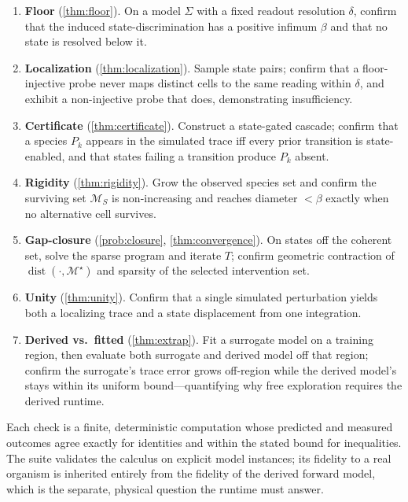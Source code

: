 \documentclass[11pt,a4paper]{article}
\theoremstyle{thmstyle}
\theoremstyle{definition}
\theoremstyle{remark}
\newcommand{\Man}{\mathcal{M}}          %
\newcommand{\flo}{\beta}                %
\DeclareMathOperator{\dist}{dist}
\begin{document}
\begin{enumerate}[leftmargin=1.6em,itemsep=3pt]
\item \textbf{Floor} (\cref{thm:floor}). On a model $\Sigma$ with a fixed
readout resolution $\delta$, confirm that the induced state-discrimination
has a positive infimum $\flo$ and that no state is resolved below it.
\item \textbf{Localization} (\cref{thm:localization}). Sample state pairs;
confirm that a floor-injective probe never maps distinct cells to the same
reading within $\delta$, and exhibit a non-injective probe that does,
demonstrating insufficiency.
\item \textbf{Certificate} (\cref{thm:certificate}). Construct a state-gated
cascade; confirm that a species $P_k$ appears in the simulated trace iff
every prior transition is state-enabled, and that states failing a
transition produce $P_k$ absent.
\item \textbf{Rigidity} (\cref{thm:rigidity}). Grow the observed species set
and confirm the surviving set $\Man_S$ is non-increasing and reaches
diameter $<\flo$ exactly when no alternative cell survives.
\item \textbf{Gap-closure} (\cref{prob:closure}, \cref{thm:convergence}).
On states off the coherent set, solve the sparse program and iterate $T$;
confirm geometric contraction of $\dist(\cdot,\Man^\star)$ and sparsity of
the selected intervention set.
\item \textbf{Unity} (\cref{thm:unity}). Confirm that a single simulated
perturbation yields both a localizing trace and a state displacement from
one integration.
\item \textbf{Derived vs.\ fitted} (\cref{thm:extrap}). Fit a surrogate model
on a training region, then evaluate both surrogate and derived model off
that region; confirm the surrogate's trace error grows off-region while the
derived model's stays within its uniform bound---quantifying why free
exploration requires the derived runtime.
\end{enumerate}

Each check is a finite, deterministic computation whose predicted and
measured outcomes agree exactly for identities and within the stated bound
for inequalities. The suite validates the calculus on explicit model
instances; its fidelity to a real organism is inherited entirely from the
fidelity of the derived forward model, which is the separate, physical
question the runtime must answer.

\end{document}
